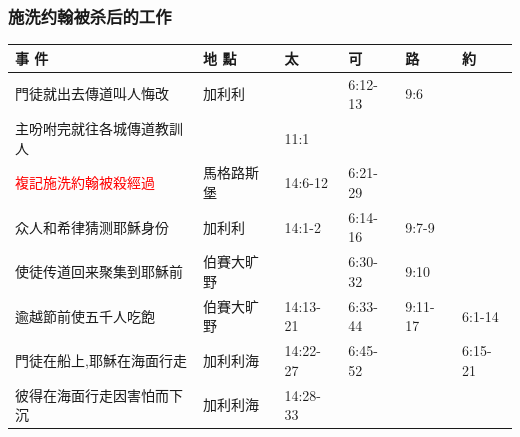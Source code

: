 \subsubsection{施洗约翰被杀后的工作}
\begin{table}[H]\centering 
\begin{tabular}{p{13.07em}|p{8.43em}|p{5.285em}|p{5.57em}|p{5.285em}|p{4.855em}}
\toprule
\textbf{事 件} & \textbf{地 點} & \textbf{太} & \textbf{可} & \textbf{路} & \textbf{約} \\\midrule
門徒就出去傳道叫人悔改& 加利利   &&6:12-13& 9:6& \multicolumn{1}{r}{} \\ \midrule

主吩咐完就往各城傳道教訓人& &11:1&&& \multicolumn{1}{r}{} \\ \midrule


\textcolor{red}{複記施洗約翰被殺經過} & 馬格路斯堡 & 14:6-12 & 6:21-29 & \multicolumn{1}{r|}{} & \multicolumn{1}{r}{} \\ \midrule

众人和希律猜测耶穌身份& 加利利   &14:1-2& 6:14-16 & 9:7-9 & \multicolumn{1}{r}{} \\ \midrule


使徒传道回来聚集到耶穌前& 伯賽大旷野&  & 6:30-32& 9:10 &  \\
   \midrule     



逾越節前使五千人吃飽 & 伯賽大旷野& 14:13-21 & 6:33-44 & 9:11-17 & 6:1-14 \\
   \midrule  

門徒在船上,耶穌在海面行走 & 加利利海  & 14:22-27& 6:45-52 &       & \multicolumn{1}{p{4.855em}}{6:15-21} \\\midrule

彼得在海面行走因害怕而下沉& 加利利海  & 14:28-33 & &       & \multicolumn{1}{p{4.855em}}{} \\\midrule



\end{tabular}
\end{table}
